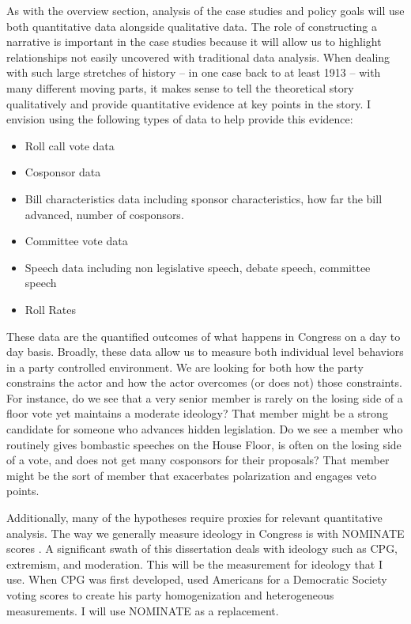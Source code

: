 \documentclass[12pt]{article}
\begin{document}
As with the overview section, analysis of the case studies and policy goals will use both quantitative data alongside qualitative data. The role of constructing a narrative is important in the case studies because it will allow us to highlight relationships not easily uncovered with traditional data analysis. When dealing with such large stretches of history -- in one case back to at least 1913 -- with many different moving parts, it makes sense to tell the theoretical story qualitatively and provide quantitative evidence at key points in the story. I envision using the following types of data to help provide this evidence:
\begin{itemize}
\setlength{\itemsep}{-2pt}
\item Roll call vote data
\item Cosponsor data
\item Bill characteristics data including sponsor characteristics, how far the bill advanced, number of cosponsors.
\item Committee vote data
\item Speech data including non legislative speech, debate speech, committee speech
\item Roll Rates
\end{itemize}
These data are the quantified outcomes of what happens in Congress on a day to day basis. Broadly, these data allow us to measure both individual level behaviors in a party controlled environment. We are looking for both how the party constrains the actor and how the actor overcomes (or does not) those constraints. For instance, do we see that a very senior member is rarely on the losing side of a floor vote yet maintains a moderate ideology? That member might be a strong candidate for someone who advances hidden legislation. Do we see a member who routinely gives bombastic speeches on the House Floor, is often on the losing side of a vote, and does not get many cosponsors for their proposals? That member might be the sort of member that exacerbates polarization and engages veto points.

Additionally, many of the hypotheses require proxies for relevant quantitative analysis. The way we generally measure ideology in Congress is with NOMINATE scores \citep{poole1997}. A significant swath of this dissertation deals with ideology such as CPG, extremism, and moderation. This will be the measurement for ideology that I use. When CPG was first developed, \cite{rohde1991} used Americans for a Democratic Society voting scores to create his party homogenization and heterogeneous measurements. I will use NOMINATE as a replacement.
\end{document}
